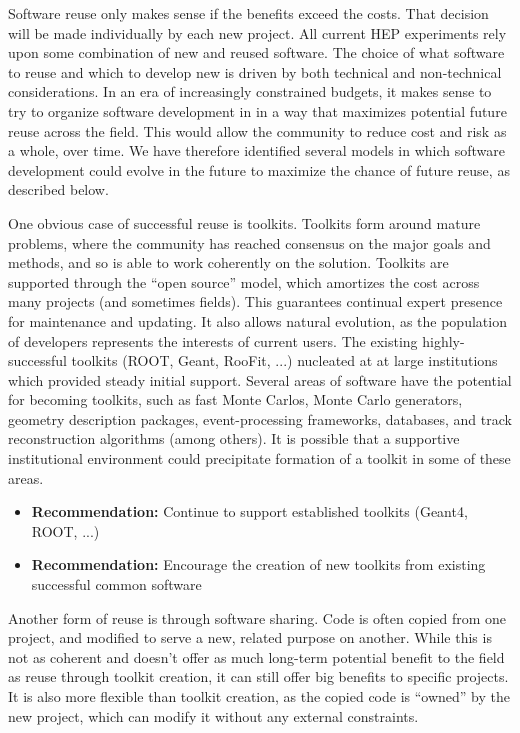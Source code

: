 Software reuse only makes sense if the benefits exceed the costs.
That decision will be made individually by each new project.
All current HEP experiments rely upon some combination of new and reused
software. The choice of what software to reuse and which to develop
new is driven by both technical and non-technical considerations.
In an era of increasingly constrained budgets,
it makes sense to try to organize software development
in \HEP in a way that maximizes potential future
reuse across the field.  This would allow the community
to reduce cost and risk as a whole, over time.
We have therefore identified several models in which
\HEP software development could evolve in the future to maximize the chance
of future reuse, as described below.

One obvious case of successful reuse is toolkits.  Toolkits form around mature problems,
where the community has reached consensus on the major goals and methods,
and so is able to work coherently on the solution.
Toolkits are supported through the ``open source'' model, which amortizes
the cost across many projects (and sometimes fields).
This guarantees continual expert presence for maintenance and updating.
It also allows natural evolution, as the population
of developers represents the interests of current users.
The existing highly-successful toolkits (ROOT, Geant, RooFit, ...) nucleated at
at large institutions which provided steady initial support.
Several areas of \HEP software have the potential
for becoming toolkits, such as fast Monte Carlos, Monte Carlo generators, 
geometry description packages,
event-processing frameworks, databases, and track reconstruction algorithms (among others).
It is possible that a supportive institutional environment
could precipitate formation of a toolkit in some of these areas. 

\begin{itemize}
\item[] {\bf Recommendation:} 
Continue to support established toolkits (Geant4, ROOT, ...)
\item[] {\bf Recommendation:} 
Encourage the creation of new toolkits from existing successful common software
\end{itemize}

Another form of reuse is through software sharing.  Code is often copied from one project,
and modified to serve a new, related purpose on another.  While
this is not as coherent and doesn't offer as much long-term
potential benefit to the field as reuse through toolkit creation,
it can still offer big benefits to specific projects.
It is also more flexible than toolkit creation, as the copied code
is ``owned'' by the new project, which can modify it without any external constraints.

